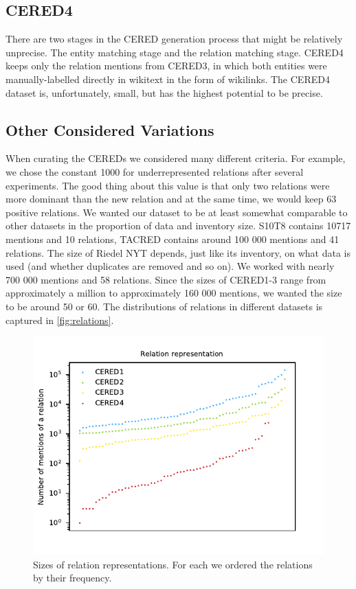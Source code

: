 \subsection{CERED4}
There are two stages in the CERED generation process that might be relatively unprecise. The entity matching stage and the relation matching stage. CERED4 keeps only the relation mentions from CERED3, in which both entities were manually-labelled directly in wikitext in the form of wikilinks. The CERED4 dataset is, unfortunately, small, but has the highest potential to be precise.


%


\subsection{Other Considered Variations}
\label{sec:otherconsideredvariations}
When curating the CEREDs we considered many different criteria. For example, we chose the constant 1000 for underrepresented relations after several experiments. The good thing about this value is that only two relations were more dominant than the new  relation and at the same time, we would keep 63 positive relations. We wanted our dataset to be at least somewhat comparable to other datasets in the proportion of data and inventory size. S10T8 contains 10717 mentions and 10 relations, TACRED contains around 100 000 mentions and 41 relations. The size of Riedel NYT depends, just like its inventory, on what data is used (and whether duplicates are removed and so on). We worked with nearly 700 000 mentions and 58 relations. Since the sizes of CERED1-3 range from approximately a million to approximately 160 000 mentions, we wanted the size to be around 50 or 60. The distributions of relations in different datasets is captured in \autoref{fig:relations}.



\begin{figure}[h]\centering
\includegraphics[scale=1]{./img/Relations1-4}
\caption{Sizes of relation representations. For each we ordered the relations by their frequency.}
\label{obr:relations}
\end{figure}

